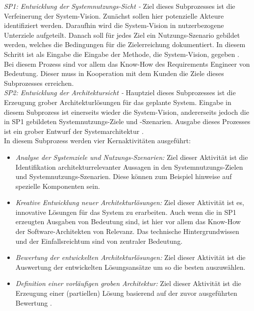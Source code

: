 \emph{SP1: Entwicklung der Systemnutzungs-Sicht -}
Ziel dieses Subprozesses ist die Verfeinerung der System-Vision. Zun\"achst sollen hier potenzielle Akteure identifiziert werden. Daraufhin wird die System-Vision in nutzerbezogene Unterziele aufgeteilt. Danach soll f\"ur jedes Ziel ein Nutzungs-Szenario gebildet werden, welches die Bedingungen f\"ur die Zielerreichung dokumentiert. In diesem Schritt ist als Eingabe die Eingabe der Methode, die System-Vision, gegeben \cite{Poh01}. Bei diesem Prozess sind vor allem das Know-How des Requirements Engineer von Bedeutung. Dieser muss in Kooperation mit dem Kunden die Ziele dieses Subprozesses erreichen.\\

\emph{SP2: Entwicklung der Architektursicht -}
Hauptziel dieses Subprozesses ist die Erzeugung grober Architekturl\"osungen f\"ur das geplante System. Eingabe in diesem Subprozess ist einerseits wieder die System-Vision, andererseits jedoch die in SP1 gebildeten Systemnutzungs-Ziele und -Szenarien. Ausgabe dieses Prozesses ist ein grober Entwurf der Systemarchitektur \cite{Poh01}.\\

In diesem Subprozess werden vier Kernaktivit\"aten ausgef\"uhrt:\\

\begin{itemize}
\item \emph{Analyse der Systemziele und Nutzungs-Szenarien:} Ziel dieser Aktivit\"at ist die Identifikation architekturrelevanter Aussagen in den Systemnutzungs-Zielen und Systemnutzungs-Szenarien. Diese k\"onnen zum Beispiel hinweise auf spezielle Komponenten sein. 
\item \emph{Kreative Entwicklung neuer Architekturl\"osungen:} Ziel dieser Aktivit\"at ist es, innovative L\"osungen f\"ur das System zu erarbeiten. Auch wenn die in SP1 erzeugten Ausgaben von Bedeutung sind, ist hier vor allem das Know-How der Software-Architekten von Relevanz. Das technische Hintergrundwissen und der Einfallsreichtum sind von zentraler Bedeutung.
\item \emph{Bewertung der entwickelten Architekturl\"osungen:} Ziel dieser Aktivit\"at ist die Auswertung der entwickelten L\"osungsans\"atze um so die besten auszuw\"ahlen. 
\item \emph{Definition einer vorl\"aufigen groben Architektur:} Ziel dieser Aktivit\"at ist die Erzeugung einer (partiellen) L\"osung basierend auf der zuvor ausgef\"uhrten Bewertung \cite{Poh01}.\\
\end{itemize} 

